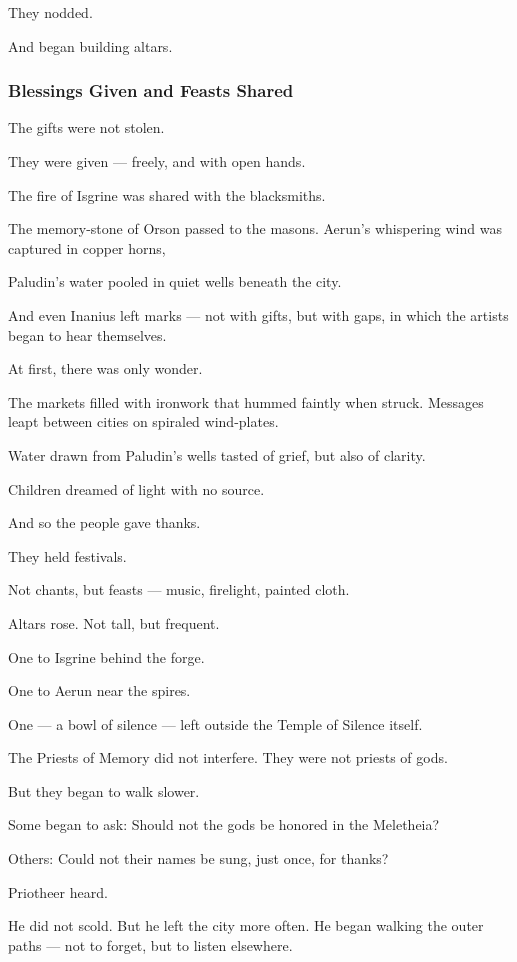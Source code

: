 \documentclass[12pt]{article}
\begin{document}
They nodded.

And began building altars.


\dotfill

\subsubsection*{Blessings Given and Feasts Shared}

The gifts were not stolen.  

They were given — freely, and with open hands.

The fire of Isgrine was shared with the blacksmiths.  

The memory-stone of Orson passed to the masons.  
Aerun’s whispering wind was captured in copper horns,  

Paludin’s water pooled in quiet wells beneath the city.  

And even Inanius left marks —  
not with gifts, but with gaps,  
in which the artists began to hear themselves.

At first, there was only wonder.

The markets filled with ironwork that hummed faintly when struck.  
Messages leapt between cities on spiraled wind-plates.  

Water drawn from Paludin’s wells tasted of grief, but also of clarity.  

Children dreamed of light with no source.

And so the people gave thanks.

They held festivals. 

Not chants, but feasts — music, firelight, painted cloth.

Altars rose. Not tall, but frequent.

One to Isgrine behind the forge.  

One to Aerun near the spires.  

One — a bowl of silence — left outside the Temple of Silence itself.

The Priests of Memory did not interfere.  
They were not priests of gods.

But they began to walk slower.

Some began to ask:  
Should not the gods be honored in the Meletheia?

Others:  
Could not their names be sung, just once, for thanks?

Priotheer heard.

He did not scold.  
But he left the city more often.  
He began walking the outer paths — not to forget, but to listen elsewhere.
\end{document}
